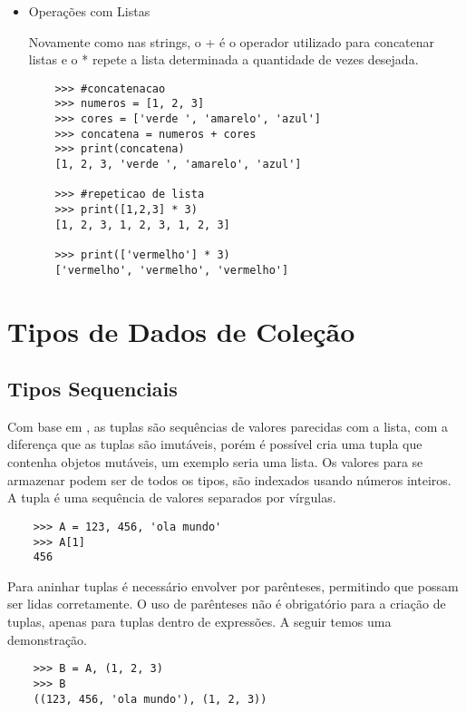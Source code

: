 	\begin{itemize}
	\item {Operações com Listas}
	
	Novamente como nas strings, o + é o operador utilizado para concatenar listas e o * repete a lista determinada a quantidade de vezes desejada.
	
	\begin{lstlisting}
	>>> #concatenacao
	>>> numeros = [1, 2, 3]
	>>> cores = ['verde ', 'amarelo', 'azul']
	>>> concatena = numeros + cores
	>>> print(concatena)
	[1, 2, 3, 'verde ', 'amarelo', 'azul']
	
	>>> #repeticao de lista
	>>> print([1,2,3] * 3)
	[1, 2, 3, 1, 2, 3, 1, 2, 3]
	
	>>> print(['vermelho'] * 3)
	['vermelho', 'vermelho', 'vermelho']
	\end{lstlisting}

	\end{itemize}
    \section{Tipos de Dados de Coleção}


            \subsection{Tipos Sequenciais}
	 Com base em \cite{Severance2016}, as tuplas são sequências de valores parecidas com a lista, com a diferença que as tuplas são imutáveis, porém é possível cria uma tupla que contenha objetos mutáveis, um exemplo seria uma lista. Os valores para se armazenar podem ser de todos os tipos, são indexados usando números inteiros. A tupla é uma sequência de valores separados por vírgulas.
	\begin{lstlisting}
	>>> A = 123, 456, 'ola mundo'
	>>> A[1]
	456	
	\end{lstlisting}
	Para aninhar tuplas é necessário envolver por parênteses, permitindo que possam ser lidas corretamente. O uso de parênteses não é obrigatório para a criação de tuplas, apenas para tuplas dentro de expressões. A seguir temos uma demonstração.
	\begin{lstlisting}
	>>> B = A, (1, 2, 3)
	>>> B
	((123, 456, 'ola mundo'), (1, 2, 3))
	\end{lstlisting}
	

